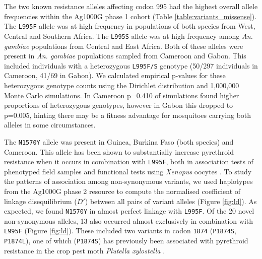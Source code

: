 \documentclass[a4paper,11pt,abstracton,hidelinks]{scrartcl}
\begin{document}
{\begin{landscape}
\begin{table}[h]
\begin{threeparttable}
\begin{tablenotes}
  \end{tablenotes}

  \end{threeparttable}

\end{table}
\end{landscape}
\restoregeometry
} %


The two known resistance alleles affecting codon 995 had the highest overall allele frequencies within the Ag1000G phase 1 cohort (Table \ref{table:variants_missense}).
%
The \texttt{L995F} allele was at high frequency in populations of both species from West, Central and Southern Africa.
%
The \texttt{L995S} allele was at high frequency among \textit{An. gambiae} populations from Central and East Africa.
%
Both of these alleles were present in \textit{An. gambiae} populations sampled from Cameroon and Gabon.
%
This included individuals with a heterozygous \texttt{L995F/S} genotype (50/297 individuals in Cameroon, 41/69 in Gabon).
%
We calculated empirical p-values for these heterozygous genotype counts using the Dirichlet distribution and 1,000,000 Monte Carlo simulations.
%
In Cameroon p=0.410 of simulations found higher proportions of heterozygous genotypes, however in Gabon this dropped to p=0.005, hinting there may be a fitness advantage for mosquitoes carrying both alleles in some circumstances.
%


%
The \texttt{N1570Y} allele was present in Guinea, Burkina Faso (both species) and Cameroon.
%
This allele has been shown to substantially increase pyrethroid resistance when it occurs in combination with \texttt{L995F}, both in association tests of phenotyped field samples \cite{Jones2012} and functional tests using \textit{Xenopus} oocytes \cite{Wang2015}.
%
To study the patterns of association among non-synonymous variants, we used haplotypes from the Ag1000G phase 2 resource to compute the normalised coefficient  of linkage disequilibrium ($D'$) between all pairs of variant alleles (Figure \ref{fig:ld}).
%
As expected, we found \texttt{N1570Y} in almost perfect linkage with \texttt{L995F}.
%
Of the 20 novel non-synonymous alleles, 13 also occurred almost exclusively in combination with \texttt{L995F} (Figure \ref{fig:ld}).
%
These included two variants in codon \texttt{1874} (\texttt{P1874S}, \texttt{P1874L}), one of which (\texttt{P1874S}) has previously been associated with pyrethroid resistance in the crop pest moth \textit{Plutella xylostella} \cite{Sonoda2008}.
\end{document}
